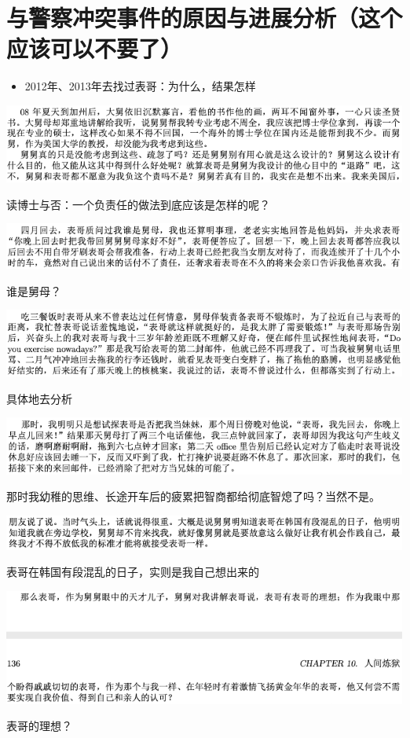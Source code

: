 \documentclass[9pt, b5paper]{article}
\begin{document}
\section{与警察冲突事件的原因与进展分析（这个应该可以不要了）}
\label{sec:org58b18cb}
\begin{itemize}
\item 2012年、2013年去找过表哥：为什么，结果怎样
\end{itemize}
\begin{center}
\includegraphics[width=.9\linewidth]{./pic/p1p136-5.png}
\end{center}
读博士与否：一个负责任的做法到底应该是怎样的呢？
\begin{center}
\includegraphics[width=.9\linewidth]{./pic/p1p125-3.png}
\end{center}
谁是舅母？
\begin{center}
\includegraphics[width=.9\linewidth]{./pic/p1p125-2.png}
\end{center}
具体地去分析
\begin{center}
\includegraphics[width=.9\linewidth]{./pic/p1p125-1.png}
\end{center}
那时我幼稚的思维、长途开车后的疲累把智商都给彻底智熄了吗？当然不是。
\begin{center}
\includegraphics[width=.9\linewidth]{./pic/p1p49-3.png}
\end{center}
表哥在韩国有段混乱的日子，实则是我自己想出来的
\begin{center}
\includegraphics[width=.9\linewidth]{./pic/p1p135-05.png}
\end{center}
表哥的理想？
\end{document}
